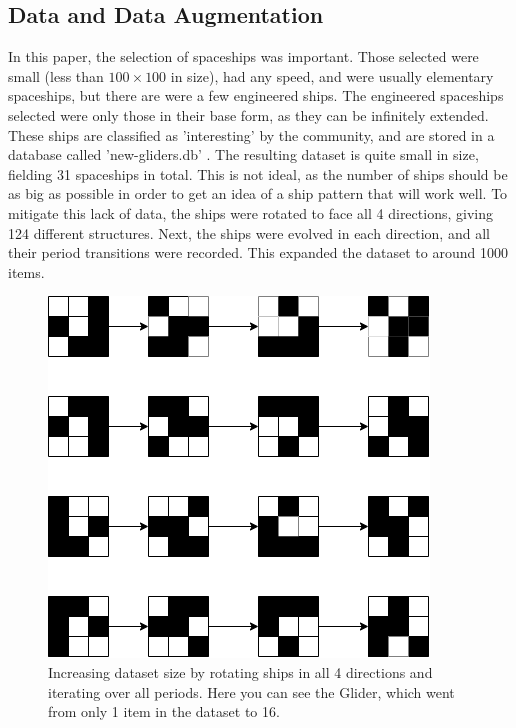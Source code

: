 \documentclass{l4proj}
\begin{document}
\subsection{Data and Data Augmentation}

In this paper, the selection of spaceships was important. Those selected were small (less than $100 \times 100$ in size), had any speed, and were usually elementary spaceships, but there are were a few engineered ships. The engineered spaceships selected were only those in their base form, as they can be infinitely extended. These ships are classified as 'interesting' by the community, and are stored in a database called 'new-gliders.db' \citep{newgliders_db}. The resulting dataset is quite small in size, fielding 31 spaceships in total. This is not ideal, as the number of ships should be as big as possible in order to get an idea of a ship pattern that will work well. To mitigate this lack of data, the ships were rotated to face all 4 directions, giving 124 different structures. Next, the ships were evolved in each direction, and all their period transitions were recorded. This expanded the dataset to around 1000 items.

\begin{figure}[h!]
\centering
\includegraphics[width=\textwidth]{dissertation/images/diagrams/increasing_ship_data.png} 
\caption{Increasing dataset size by rotating ships in all 4 directions and iterating over all periods. Here you can see the Glider, which went from only 1 item in the dataset to 16.}
\label{fig:subim1}
\end{figure}
\end{document}
